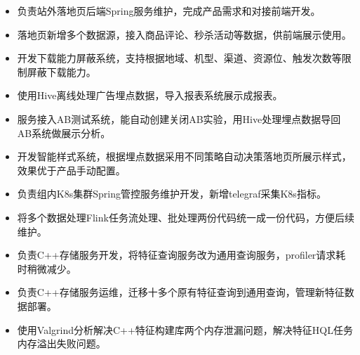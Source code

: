 \documentclass{resume}
\begin{document}


\begin{itemize}
  \item 负责站外落地页后端Spring服务维护，完成产品需求和对接前端开发。
  \item 落地页新增多个数据源，接入商品评论、秒杀活动等数据，供前端展示使用。
  \item 开发下载能力屏蔽系统，支持根据地域、机型、渠道、资源位、触发次数等限制屏蔽下载能力。
  \item 使用Hive离线处理广告埋点数据，导入报表系统展示成报表。
  \item 服务接入AB测试系统，能自动创建关闭AB实验，用Hive处理埋点数据导回AB系统做展示分析。
  \item 开发智能样式系统，根据埋点数据采用不同策略自动决策落地页所展示样式，效果优于产品手动配置。
  \item 负责组内K8s集群Spring管控服务维护开发，新增telegraf采集K8s指标。
  \item 将多个数据处理Flink任务流处理、批处理两份代码统一成一份代码，方便后续维护。
  \item 负责C++存储服务开发，将特征查询服务改为通用查询服务，profiler请求耗时稍微减少。
  \item 负责C++存储服务运维，迁移十多个原有特征查询到通用查询，管理新特征数据部署。
  \item 使用Valgrind分析解决C++特征构建库两个内存泄漏问题，解决特征HQL任务内存溢出失败问题。
\end{itemize}
\end{document}
